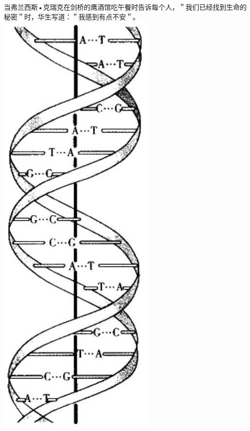 当弗兰西斯•克瑞克在剑桥的鹰酒馆吃午餐时告诉每个人，＂我们已经找到生命的秘密＂时，华生写道：＂我感到有点不安＂\cite{watson1968f}。\\
\includegraphics[width=\textwidth]{images/2025_05_15_6a28331d5e7c993ad07ag-590.jpg}

